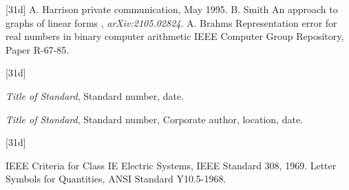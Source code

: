 \documentclass[correspondence]{IEEEtaes}
\begin{document}
\vspace*{-12pt}

\begin{thebibliography}{[31d]}
\setcounter{enumiv}{20}
A. Harrison
\newblock private communication, May 1995.
B. Smith
\newblock An approach to graphs of linear forms
, \emph{arXiv:2105.02824}.
A. Brahms
\newblock Representation error for real numbers in binary computer arithmetic
\newblock IEEE Computer Group Repository, Paper R-67-85.
\end{thebibliography}


\vspace*{-12pt}
\begin{thebibliography}{[31d]}
\item[a)]\emph{Title of Standard}, Standard number, date.
\item[b)]\emph{Title of Standard}, Standard number, Corporate author, location, date.
\end{thebibliography}


\vspace*{-12pt}
\begin{thebibliography}{[31d]}
\setcounter{enumiv}{23}

IEEE Criteria for Class IE Electric Systems, IEEE Standard 308, 1969.
Letter Symbols for Quantities, ANSI Standard Y10.5-1968.
\end{thebibliography}
\end{document}
